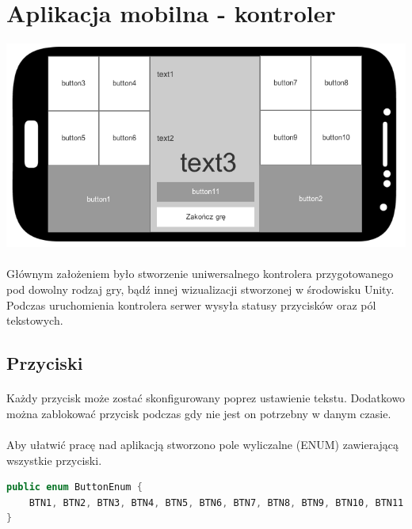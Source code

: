 \newpage
\section{Aplikacja mobilna - kontroler}

\begin{center}
\includegraphics[width=1\textwidth]{images/button_mockup.png}
\end{center}
\paragraph{}
Głównym założeniem było stworzenie uniwersalnego kontrolera przygotowanego pod dowolny rodzaj gry, bądź innej wizualizacji stworzonej w środowisku Unity. Podczas uruchomienia kontrolera serwer wysyła statusy przycisków oraz pól tekstowych.

\subsection{Przyciski}
\paragraph{}
Każdy przycisk może zostać skonfigurowany poprez ustawienie tekstu. Dodatkowo można zablokować przycisk podczas gdy nie jest on potrzebny w danym czasie.
\paragraph{}
Aby ułatwić pracę nad aplikacją stworzono pole wyliczalne (ENUM) zawierającą wszystkie przyciski.

\begin{lstlisting}[language=Java]
public enum ButtonEnum {
    BTN1, BTN2, BTN3, BTN4, BTN5, BTN6, BTN7, BTN8, BTN9, BTN10, BTN11
}
\end{lstlisting}
